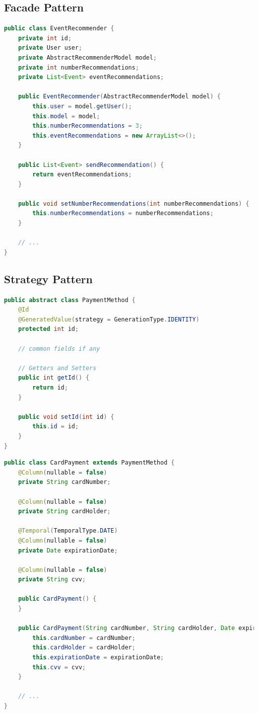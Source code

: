 \documentclass{article}
\begin{document}
\subsection{Facade Pattern}
\begin{lstlisting}[language=Java, caption={Facade for Event Recommender}]
public class EventRecommender {
    private int id;
    private User user;
    private AbstractRecommenderModel model;
    private int numberRecommendations;
    private List<Event> eventRecommendations;

    public EventRecommender(AbstractRecommenderModel model) {
        this.user = model.getUser();
        this.model = model;
        this.numberRecommendations = 3;
        this.eventRecommendations = new ArrayList<>();
    }

    public List<Event> sendRecommendation() {
        return eventRecommendations;
    }

    public void setNumberRecommendations(int numberRecommendations) {
        this.numberRecommendations = numberRecommendations;
    }

    // ...
}
\end{lstlisting}

\subsection{Strategy Pattern}
\begin{lstlisting}[language=Java, caption={Strategy Pattern for Payment Method}]
public abstract class PaymentMethod {
    @Id
    @GeneratedValue(strategy = GenerationType.IDENTITY)
    protected int id;

    // common fields if any

    // Getters and Setters
    public int getId() {
        return id;
    }

    public void setId(int id) {
        this.id = id;
    }
}
\end{lstlisting}

\begin{lstlisting}[language=Java, caption={Card Payment Implementation}]
public class CardPayment extends PaymentMethod {
    @Column(nullable = false)
    private String cardNumber;

    @Column(nullable = false)
    private String cardHolder;

    @Temporal(TemporalType.DATE)
    @Column(nullable = false)
    private Date expirationDate;

    @Column(nullable = false)
    private String cvv;

    public CardPayment() {
    }

    public CardPayment(String cardNumber, String cardHolder, Date expirationDate, String cvv) {
        this.cardNumber = cardNumber;
        this.cardHolder = cardHolder;
        this.expirationDate = expirationDate;
        this.cvv = cvv;
    }

    // ...
}
\end{lstlisting}
\end{document}
